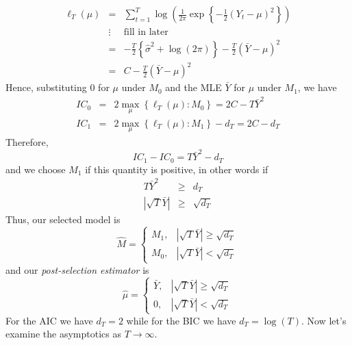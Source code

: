 \begin{eqnarray*}
	\ell_T(\mu)&=& \sum_{t=1}^T \log \left( \frac{1}{2\pi} \exp \left\{-\frac{1}{2}(Y_t - \mu)^2 \right\}\right)\\
	&\vdots& \boxed{\mbox{fill in later}}\\
	&=& -\frac{T}{2} \left\{ \widehat{\sigma}^2 + \log(2\pi)\right\} - \frac{T}{2}\left(\bar{Y} - \mu \right)^2\\
	&=& C - \frac{T}{2}\left(\bar{Y} - \mu \right)^2
\end{eqnarray*}
Hence, substituting $0$ for $\mu$ under $M_0$ and the MLE $\bar{Y}$ for $\mu$ under $M_1$, we have
	\begin{eqnarray*}
		IC_0 &=& 2 \max_\mu \left\{\ell_T(\mu)\colon M_0 \right\} = 2C - T\bar{Y}^2\\
		IC_1 &=&2 \max_\mu \left\{\ell_T(\mu)\colon M_1 \right\} - d_T = 2C - d_T
	\end{eqnarray*}
Therefore,
	$$IC_1 - IC_0 = T\bar{Y}^2 - d_T$$
and we choose $M_1$ if this quantity is positive, in other words if
	\begin{eqnarray*}
		T\bar{Y}^2 &\geq& d_T\\
		\left|\sqrt{T} \bar{Y} \right| &\geq& \sqrt{d_T}
	\end{eqnarray*}
Thus, our selected model is 
	$$\widehat{M} = \left\{\begin{array}
		{cc} M_1, & |\sqrt{T}\bar{Y} | \geq \sqrt{d_T} \\
		M_0, & |\sqrt{T}\bar{Y} |  < \sqrt{d_T}
	\end{array} \right.$$
and our \emph{post-selection estimator} is 
	$$\widehat{\mu}=\left\{\begin{array}
		{cc} \bar{Y}, & |\sqrt{T}\bar{Y} | \geq \sqrt{d_T} \\
		0, & |\sqrt{T}\bar{Y} | < \sqrt{d_T}
		\end{array}\right.$$
For the AIC we have $d_T = 2$ while for the BIC we have $d_T = \log(T)$. Now let's examine the asymptotics as $T \rightarrow \infty$.

